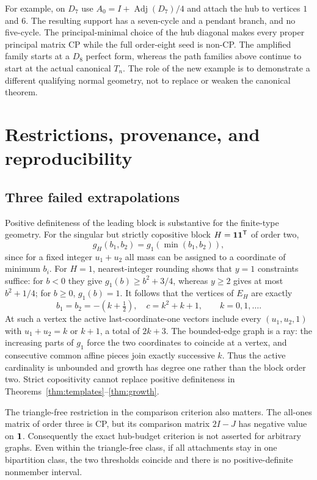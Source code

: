 \documentclass[11pt]{article}
\theoremstyle{definition}\newtheorem{definition}[theorem]{Definition}
\theoremstyle{remark}\newtheorem{remark}[theorem]{Remark}
\newcommand{\T}{^{\mathsf T}}\newcommand{\norm}[1]{\lVert #1\rVert}
\begin{document}
For example, on $D_7$ use $A_0=I+\operatorname{Adj}(D_7)/4$ and attach the hub to vertices $1$ and $6$. The resulting support has a seven-cycle and a pendant branch, and no five-cycle. The principal-minimal choice of the hub diagonal makes every proper principal matrix CP while the full order-eight seed is non-CP. The amplified family starts at a $D_8$ perfect form, whereas the path families above continue to start at the actual canonical $T_n$. The role of the new example is to demonstrate a different qualifying normal geometry, not to replace or weaken the canonical theorem.

\section{Restrictions, provenance, and reproducibility}
\subsection{Three failed extrapolations}
Positive definiteness of the leading block is substantive for the finite-type geometry. For the singular but strictly copositive block $H={\bf1}{\bf1}\T$ of order two,
\[
 g_H(b_1,b_2)=g_1(\min(b_1,b_2)),
\]
since for a fixed integer $u_1+u_2$ all mass can be assigned to a coordinate of minimum $b_i$. For $H=1$, nearest-integer rounding shows that $y=1$ constraints suffice: for $b<0$ they give $g_1(b)\ge b^2+3/4$, whereas $y\ge2$ gives at most $b^2+1/4$; for $b\ge0$, $g_1(b)=1$. It follows that the vertices of $E_H$ are exactly
\[
 b_1=b_2=-(k+\tfrac12),\quad c=k^2+k+1,\qquad k=0,1,\ldots.
\]
At such a vertex the active last-coordinate-one vectors include every $(u_1,u_2,1)$ with $u_1+u_2=k$ or $k+1$, a total of $2k+3$. The bounded-edge graph is a ray: the increasing parts of $g_1$ force the two coordinates to coincide at a vertex, and consecutive common affine pieces join exactly successive $k$. Thus the active cardinality is unbounded and growth has degree one rather than the block order two. Strict copositivity cannot replace positive definiteness in Theorems~\ref{thm:templates}--\ref{thm:growth}.

The triangle-free restriction in the comparison criterion also matters. The all-ones matrix of order three is CP, but its comparison matrix $2I-J$ has negative value on ${\bf1}$. Consequently the exact hub-budget criterion is not asserted for arbitrary graphs. Even within the triangle-free class, if all attachments stay in one bipartition class, the two thresholds coincide and there is no positive-definite nonmember interval.
\end{document}
